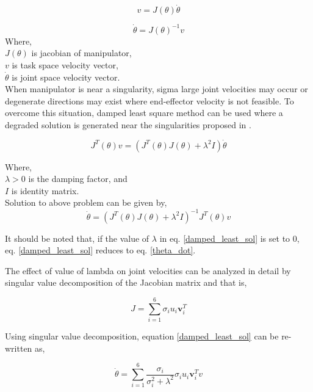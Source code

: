 \begin{equation}\label{theta_dot}
	v = J(\theta) \dot{\theta} 
\end{equation}

\begin{equation}
	\dot{\theta} = J(\theta)^{-1}  v
\end{equation} 
Where, \\
$J(\theta)$ is jacobian of manipulator, \\
$v$ is task space velocity vector, \\
$\dot{\theta}$ is joint space velocity vector. \\

When manipulator is near a singularity, sigma  large joint velocities may occur or degenerate directions may exist where end-effector velocity
is not feasible\cite{chiaverini1994review}. To overcome this situation, damped least square method can be used where a degraded solution is generated near the singularities proposed in \cite{wampler1986manipulator, nakamura1986inverse}.  

\begin{equation}
	J^{T}(\theta)v = (J^{T}(\theta)J(\theta) + \lambda ^{2}I)\dot{\theta}
\end{equation}

Where, \\
$\lambda > 0 $ is the damping factor, and \\
$I $ is identity matrix. \\

Solution to above problem can be given by, 
\begin{equation}\label{damped_least_sol}
	\dot{\theta} = (J^{T}(\theta)J(\theta) + \lambda^{2}I)^{-1}J^{T}(\theta)v
\end{equation} 

It should be noted that, if the value of $\lambda$ in eq. \ref{damped_least_sol} is set to 0, eq. \ref{damped_least_sol} reduces to eq. \ref{theta_dot}.

The effect of value of lambda on joint velocities can be analyzed in detail by singular value decomposition of the Jacobian matrix and that is, 

\begin{equation}
	J = \sum_{i=1}^{6}\sigma_{i}u_{i}\textbf{v}_{i}^{T}
\end{equation} 

Using singular value decomposition, equation \ref{damped_least_sol} can be re-written as,

\begin{equation}
\dot{\theta} = \sum_{i=1}^{6}\frac{\sigma_{i}}{\sigma_{i}^{2} + \lambda^{2} }\sigma_{i}u_{i}\textbf{v}_{i}^{T}v
\end{equation} 

